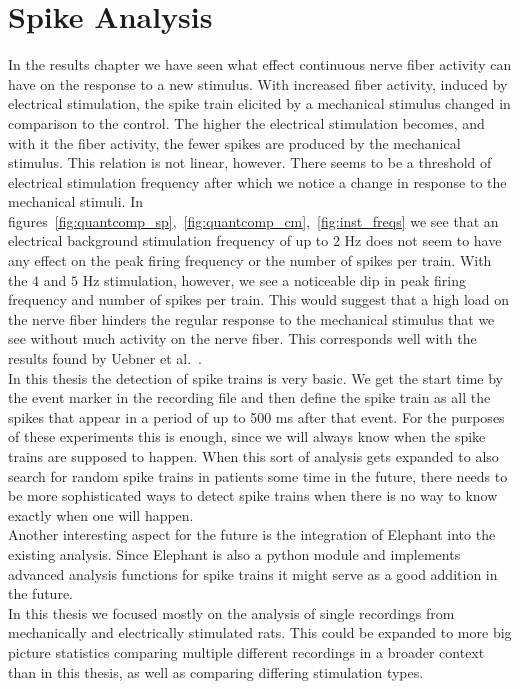 \section{Spike Analysis}
In the results chapter we have seen what effect continuous nerve fiber activity can have on the response to a new stimulus. With increased fiber activity, induced by electrical stimulation, the spike train elicited by a mechanical stimulus changed in comparison to the control. The higher the electrical stimulation becomes, and with it the fiber activity, the fewer spikes are produced by the mechanical stimulus. This relation is not linear, however. There seems to be a threshold of electrical stimulation frequency after which we notice a change in response to the mechanical stimuli. In figures~\ref{fig:quantcomp_sp},~\ref{fig:quantcomp_cm},~\ref{fig:inst_freqs} we see that an electrical background stimulation frequency of up to $2$ Hz does not seem to have any effect on the peak firing frequency or the number of spikes per train. With the $4$ and $5$ Hz stimulation, however, we see a noticeable dip in peak firing frequency and number of spikes per train. This would suggest that a high load on the nerve fiber hinders the regular response to the mechanical stimulus that we see without much activity on the nerve fiber. This corresponds well with the results found by Uebner et al.~\cite{roberto}.\\
In this thesis the detection of spike trains is very basic. We get the start time by the event marker in the recording file and then define the spike train as all the spikes that appear in a period of up to 500 ms after that event. For the purposes of these experiments this is enough, since we will always know when the spike trains are supposed to happen. When this sort of analysis gets expanded to also search for random spike trains in patients some time in the future, there needs to be more sophisticated ways to detect spike trains when there is no way to know exactly when one will happen.\\
Another interesting aspect for the future is the integration of Elephant into the existing analysis. Since Elephant is also a python module and implements advanced analysis functions for spike trains it might serve as a good addition in the future. \\
In this thesis we focused mostly on the analysis of single recordings from mechanically and electrically stimulated rats. This could be expanded to more big picture statistics comparing multiple different recordings in a broader context than in this thesis, as well as comparing differing stimulation types. \\





\cleardoublepage
